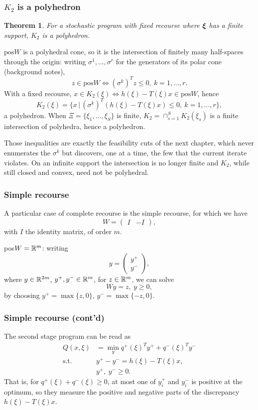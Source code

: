 \documentclass[aspectratio=169]{beamer}
\newtheorem{theo}{Theorem}
\begin{document}
\begin{frame}
\frametitle{$K_2$ is a polyhedron}
\small

\begin{theo}
For a stochastic program with fixed recourse where ${\boldsymbol{\xi}}$ has a {\red finite support}, $K_2$ is a polyhedron.
\end{theo}

$\text{pos}W$ is a polyhedral cone, so it is the intersection of finitely many half-spaces through the origin: writing $\sigma^1, \ldots, \sigma^r$ for the generators of its {\red polar cone} (background notes),
\[
z \in \text{pos}W \iff (\sigma^k)^Tz \leq 0,\ k = 1, \ldots, r.
\]
With a fixed recourse, $x \in K_2(\xi) \iff h(\xi)-T(\xi)x \in \text{pos}W$, hence
\[
K_2(\xi) = \lbrace x \,|\, (\sigma^k)^T\left(h(\xi)-T(\xi)x\right) \leq 0,\ k = 1,\ldots,r \rbrace,
\]
a polyhedron. When $\Xi = \lbrace \xi_1,\ldots,\xi_S \rbrace$ is finite, $K_2 = \cap_{s=1}^S K_2(\xi_s)$ is a finite intersection of polyhedra, hence a polyhedron.

\mbox{}

{\footnotesize Those inequalities are exactly the {\red feasibility cuts} of the next chapter, which never enumerates the $\sigma^k$ but discovers, one at a time, the few that the current iterate violates. On an infinite support the intersection is no longer finite and $K_2$, while still closed and convex, need not be polyhedral.}

\end{frame}

\begin{frame}
\frametitle{Simple recourse}

A particular case of complete recourse is the {\red simple recourse}, for which we have
\[
W = \begin{pmatrix} I & -I \end{pmatrix},
\]
with $I$ the identity matrix, of order $m$.

\mbox{}

pos$W = {\mathbb{R}}^m$: writing
$$
y = \begin{pmatrix}
	y^+ \\ y^-
\end{pmatrix},
$$
where $y \in {\mathbb{R}}^{2m}$, $y^+, y^- \in {\mathbb{R}}^m$, for $z \in {\mathbb{R}}^m$, we can solve
$$
Wy = z,\ y \geq 0,
$$
by choosing $y^+ = \max\{z,0\}$,  $y^- = \max\{-z,0\}$.

\end{frame}

\begin{frame}
\frametitle{Simple recourse (cont'd)}

The second stage program can be read as
\begin{align*}
Q(x,\xi) & = \min_y q^+(\xi)^Ty^+ + q^-(\xi)^Ty^- \\
\mbox{s.t. } & y^+ - y^- = h(\xi)-T(\xi)x,\\
& y^+,\ y^- \geq 0.
\end{align*}
That is, for $q^+(\xi) + q^-(\xi) \geq 0$, at most one of $y_i^+$ and $y_i^-$ is positive at the optimum, so they %
measure the positive and negative parts of the discrepancy $h(\xi)-T(\xi)x$.

\end{frame}
\end{document}
